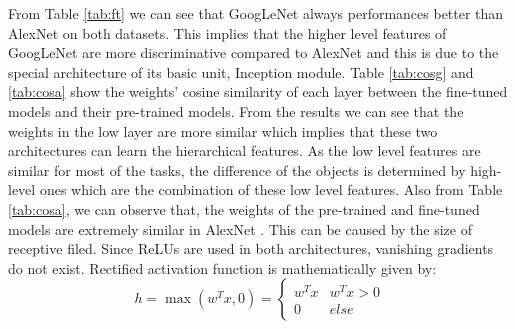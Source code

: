From Table \ref{tab:ft} we can see that GoogLeNet always performances better than AlexNet on both datasets. This implies that the higher level features of GoogLeNet are more discriminative compared to AlexNet and this is due to the special architecture of its basic unit, Inception module. Table \ref{tab:cosg} and \ref{tab:cosa} show the weights' cosine similarity of each layer between the fine-tuned models and their pre-trained models. From the results we can see that the weights in the low layer are more similar which implies that these two architectures can learn the hierarchical features. As the low level features are similar for most of the tasks, the difference of the objects is determined by high-level ones which are the combination of these low level features. Also from Table \ref{tab:cosa}, we can observe that, the weights of the pre-trained and fine-tuned models are extremely similar in AlexNet . This can be caused by the size of receptive filed. Since ReLUs are used in both architectures, vanishing gradients do not exist. Rectified activation function is mathematically given by:
      \begin{equation}\label{relu}
        h = \max ({w^T}x,0) = \left\{ {\begin{array}{*{20}{c}}
{{w^T}x}&{{w^T}x > 0}\\
0&{else}
\end{array}} \right.
      \end{equation}

